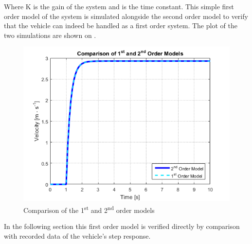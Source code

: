 %
Where \si{K} is the gain of the system and \si{\tau} is the time constant. This simple first order model of the system is simulated alongside the second order model to verify that the vehicle can indeed be handled as a first order system. The plot of the two simulations are shown on .
%
\begin{figure}[H]
	\centering
	\includegraphics[width = .8\textwidth]{figures/ComparisonOf1stAnd2ndOrderModels.png}
	\caption{Comparison of the \si{1^{st}} and \si{2^{nd}} order models}
	\label{fig:ComparisonOf1stAnd2ndOrderModels}
\end{figure}
%
In the following section this first order model is verified directly by comparison with recorded data of the vehicle's step response.
